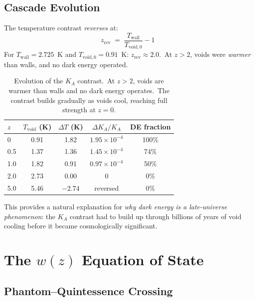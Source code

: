 \documentclass[12pt,letterpaper]{article}
\newcommand{\Ka}{K_{\!A}}
\begin{document}
\subsection{Cascade Evolution}

The temperature contrast \emph{reverses} at:
%
\begin{equation}
  z_{\mathrm{rev}} \;=\; \frac{T_{\mathrm{wall}}}{T_{\mathrm{void},0}} - 1
  \label{eq:z-reversal}
\end{equation}
%
For $T_{\mathrm{wall}} = 2.725$~K and $T_{\mathrm{void},0} = 0.91$~K:
$z_{\mathrm{rev}} \approx 2.0$.\ At $z > 2$, voids were \emph{warmer} than
walls, and no dark energy operated.

\begin{table}[h]
\centering
\begin{tabular}{@{}lcccc@{}}
\toprule
$z$ & $T_{\mathrm{void}}$ (K) & $\Delta T$ (K) &
  $\Delta\Ka/\Ka$ & DE fraction \\
\midrule
0   & 0.91 & 1.82 & $1.95 \times 10^{-4}$ & 100\% \\
0.5 & 1.37 & 1.36 & $1.45 \times 10^{-4}$ & 74\% \\
1.0 & 1.82 & 0.91 & $0.97 \times 10^{-4}$ & 50\% \\
2.0 & 2.73 & 0.00 & 0 & 0\% \\
5.0 & 5.46 & $-2.74$ & reversed & 0\% \\
\bottomrule
\end{tabular}
\caption{Evolution of the $\Ka$ contrast.\ At $z > 2$, voids are warmer than
  walls and no dark energy operates.\ The contrast builds gradually as voids
  cool, reaching full strength at $z = 0$.}
\label{tab:cascade}
\end{table}

This provides a natural explanation for \emph{why dark energy is a
late-universe phenomenon}: the $\Ka$ contrast had to build up through
billions of years of void cooling before it became cosmologically significant.


\section{The \texorpdfstring{$w(z)$}{w(z)} Equation of State}
\label{sec:wz}

\subsection{Phantom--Quintessence Crossing}
\end{document}
